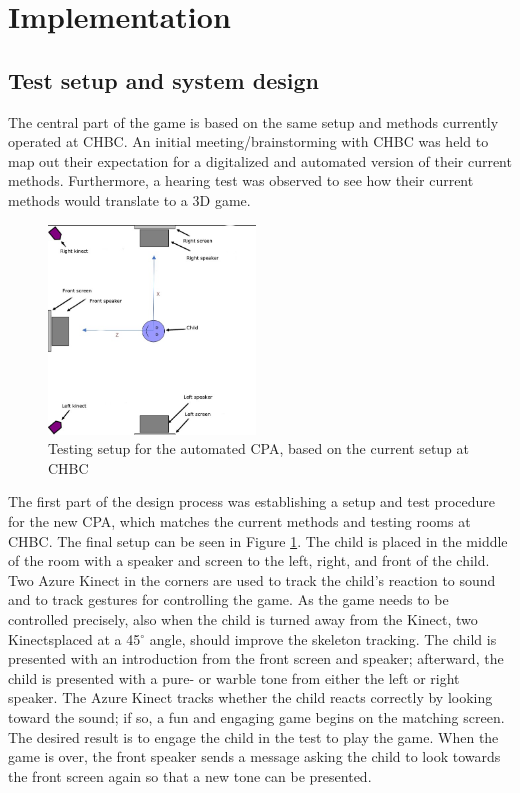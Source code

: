 \section{Implementation} \label{design}

\subsection{Test setup and system design} \label{system design}

The central part of the game is based on the same setup and methods currently operated at CHBC. An initial meeting/brainstorming with CHBC was held to map out their expectation for a digitalized and automated version of their current methods. Furthermore, a hearing test was observed to see how their current methods would translate to a 3D game. 


\begin{figure}[h]
    \centering
    \includegraphics[width = 0.49\textwidth]{SMC2022_template_Latex/images/setup(2).jpeg}
    \caption{Testing setup for the automated CPA, based on the current setup at CHBC}
    \label{fig:setup}
\end{figure}

The first part of the design process was establishing a setup and test procedure for the new CPA, which matches the current methods and testing rooms at CHBC. The final setup can be seen in Figure \ref{fig:setup}. The child is placed in the middle of the room with a speaker and screen to the left, right, and front of the child. Two Azure Kinect in the corners are used to track the child's reaction to sound and to track gestures for controlling the game. As the game needs to be controlled precisely, also when the child is turned away from the Kinect, two Kinectsplaced at a 45$^{\circ}$ angle, should improve the skeleton tracking. The child is presented with an introduction from the front screen and speaker; afterward, the child is presented with a pure- or warble tone from either the left or right speaker. The Azure Kinect  tracks whether the child reacts correctly by looking toward the sound; if so, a fun and engaging game begins on the matching screen. The desired result is to engage the child in the test to play the game. When the game is over, the front speaker sends a message asking the child to look towards the front screen again so that a new tone can be presented.  \newline 

